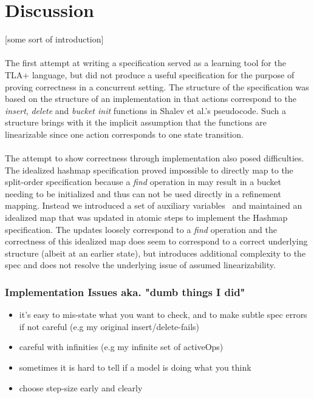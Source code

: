 \documentclass{uit-thesis}
\begin{document}
\chapter{Discussion}\label{ch:discussion}
[some sort of introduction]
\\\\
The first attempt at writing a specification served as a learning tool for the TLA+ language, but did not produce a useful specification for the purpose of proving correctness in a concurrent setting. The structure of the specification was based on the structure of an implementation in that actions correspond to the \textit{insert}, \textit{delete} and \textit{bucket init} functions in Shalev et al.'s pseudocode. Such a structure brings with it the implicit assumption that the functions are linearizable since one action corresponds to one state transition.
\\\\
The attempt to show correctness through implementation also posed difficulties. The idealized hashmap specification proved impossible to directly map to the split-order specification because a \textit{find} operation in may result in a bucket needing to be initialized and thus can not be used directly in a refinement mapping. Instead we introduced a set of auxiliary variables~\cite{Lamport2019a} and maintained an idealized map that was updated in atomic steps to implement the Hashmap specification. The updates loosely correspond to a \textit{find} operation and the correctness of this idealized map does seem to correspond to a correct underlying structure (albeit at an earlier state), but introduces additional complexity to the spec and does not resolve the underlying issue of assumed linearizability.
\subsection{Implementation Issues aka. "dumb things I did"}
\begin{itemize}
    \item it's easy to mis-state what you want to check, and to make subtle spec errors if not careful (e.g my original insert/delete-fails)
    \item careful with infinities (e.g my infinite set of activeOps)
    \item sometimes it is hard to tell if a model is doing what you think
    \item choose step-size early and clearly
\end{itemize}
\backmatter
\printbibliography{}
\appendix
{}
\end{document}
